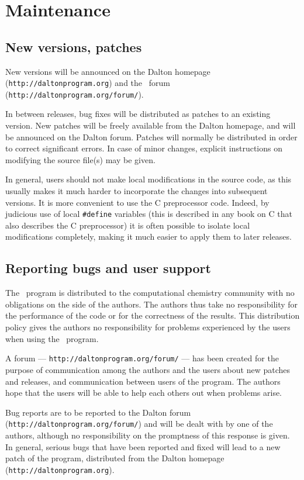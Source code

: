 \chapter{Maintenance}\label{ch:maintain}

\section{New versions, patches}

New versions will be announced on the Dalton homepage
(\verb|http://daltonprogram.org|)
and the \dalton\ forum
(\verb|http://daltonprogram.org/forum/|).

In between releases, bug fixes will be distributed as
patches to an
existing version. New patches will be
freely available from the 
Dalton homepage, and will be announced on the Dalton forum.
Patches will normally be distributed in order to correct
significant errors. In case of minor changes, explicit
instructions on modifying the source file(s) may be given.

In general, users should not make local
modifications in the source code, as this usually makes it
much harder to incorporate the changes into subsequent versions.
It is more convenient to use the C preprocessor code.  Indeed, by
judicious use of local \verb|#define| variables (this
is described in any book on C that also describes the C
preprocessor) it is often possible to isolate local
modifications completely, making it much easier
to apply them to later
releases.

\section{Reporting bugs and user support}

The \lsdalton\ program is distributed to the computational chemistry
community with no obligations on the side of the
authors. The authors thus take no responsibility
for the performance
of the code or for the correctness of the
results. This distribution
policy gives the authors no responsibility for problems experienced by
the users when using the \lsdalton\ program.

A forum ---
\verb|http://daltonprogram.org/forum/| --- has been created for
the purpose of communication among the authors and the users about
new patches and releases, and communication between users of the
program. The authors hope that the
users will be able to help each others out when problems
arise.

Bug reports are to be reported to the Dalton forum
(\verb|http://daltonprogram.org/forum/|)
and
will be dealt with by one of the authors, although no responsibility
on the promptness of this response is given. In general, serious bugs
that have been
reported and fixed will lead to a new patch of the program, distributed from the
Dalton homepage (\verb|http://daltonprogram.org|).

